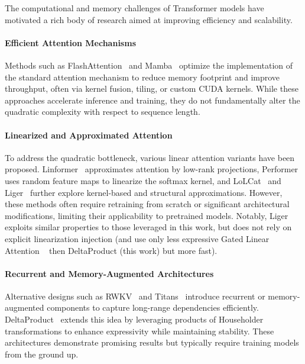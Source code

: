 \documentclass[10pt,a4paper]{article}
\begin{document}
The computational and memory challenges of Transformer models have motivated a rich body of research aimed at improving efficiency and scalability.

\paragraph{Efficient Attention Mechanisms}  
Methods such as FlashAttention~\cite{dao2023flashattention} and Mamba~\cite{gu2023mamba} optimize the implementation of the standard attention mechanism to reduce memory footprint and improve throughput, often via kernel fusion, tiling, or custom CUDA kernels. While these approaches accelerate inference and training, they do not fundamentally alter the quadratic complexity with respect to sequence length.

\paragraph{Linearized and Approximated Attention}  
To address the quadratic bottleneck, various linear attention variants have been proposed. Linformer~\cite{wang2020linformer} approximates attention by low-rank projections, Performer~\cite{choromanski2021rethinking} uses random feature maps to linearize the softmax kernel, and LoLCat~\cite{zhang2024lolcats} and Liger~\cite{lan2025liger} further explore kernel-based and structural approximations. However, these methods often require retraining from scratch or significant architectural modifications, limiting their applicability to pretrained models. Notably, Liger exploits similar properties to those leveraged in this work, but does not rely on explicit linearization injection (and use only less expressive Gated Linear Attention ~\cite{gla} then DeltaProduct (this work) but more fast).

\paragraph{Recurrent and Memory-Augmented Architectures}  
Alternative designs such as RWKV~\cite{chen2023rwkv} and Titans~\cite{behrouz2024titans} introduce recurrent or memory-augmented components to capture long-range dependencies efficiently. DeltaProduct~\cite{siems2025deltaproduct} extends this idea by leveraging products of Householder transformations to enhance expressivity while maintaining stability. These architectures demonstrate promising results but typically require training models from the ground up.
\end{document}
